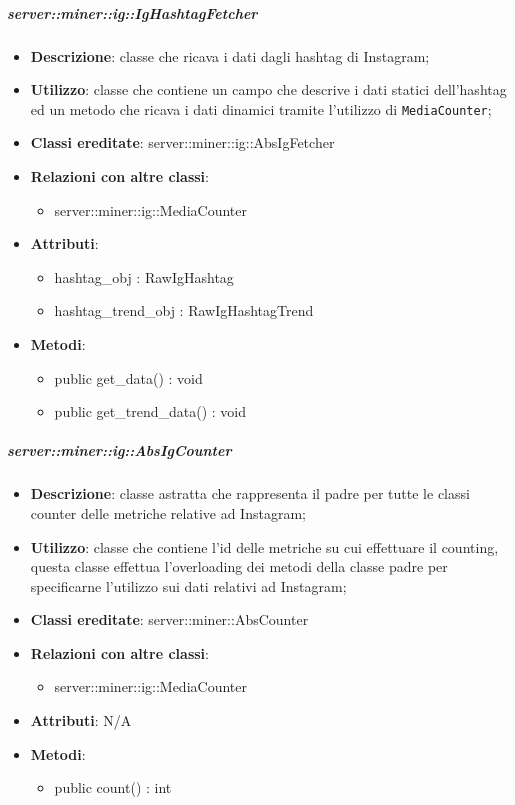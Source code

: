 	\subparagraph{server::miner::ig::IgHashtagFetcher} %
		\label{subp:server_miner_ig_IgHashtagFetcher}
			\begin{itemize}
				\item \textbf{Descrizione}: classe che ricava i dati dagli hashtag di Instagram;
				\item \textbf{Utilizzo}: classe che contiene un campo che descrive i dati statici dell'hashtag ed un metodo che ricava i dati dinamici tramite l'utilizzo di \texttt{MediaCounter};
				\item \textbf{Classi ereditate}: server::miner::ig::AbsIgFetcher
				\item \textbf{Relazioni con altre classi}:
					\begin{itemize}
						\item server::miner::ig::MediaCounter
					\end{itemize}
				\item \textbf{Attributi}:    
					\begin{itemize}
						\item hashtag\_obj : RawIgHashtag
						\item hashtag\_trend\_obj : RawIgHashtagTrend
					\end{itemize}
				\item \textbf{Metodi}:  
					\begin{itemize}
						\item public get\_data() : void
						\item public get\_trend\_data() : void
					\end{itemize}
			\end{itemize}

	\subparagraph{server::miner::ig::AbsIgCounter} %
		\label{subp:server_miner_ig_AbsIgCounter}
			\begin{itemize}
				\item \textbf{Descrizione}: classe astratta che rappresenta il padre per tutte le classi counter delle metriche relative ad Instagram;
				\item \textbf{Utilizzo}: classe che contiene l’id delle metriche su cui effettuare il counting, questa classe effettua l'overloading dei metodi della classe padre per specificarne l’utilizzo sui dati relativi ad Instagram;
				\item \textbf{Classi ereditate}: server::miner::AbsCounter
				\item \textbf{Relazioni con altre classi}:
					\begin{itemize}
						\item server::miner::ig::MediaCounter
					\end{itemize}
				\item \textbf{Attributi}: N/A
				\item \textbf{Metodi}: 
					\begin{itemize}
						\item public count() : int
					\end{itemize}
			\end{itemize}


